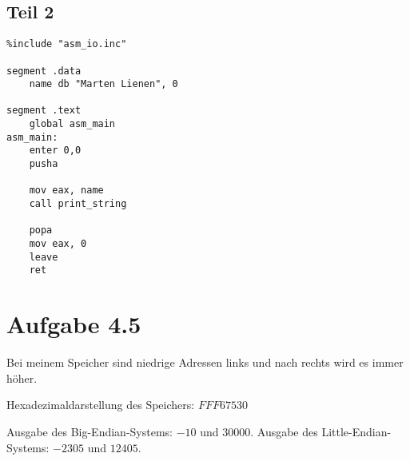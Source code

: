 \documentclass[10pt,a4paper]{article}
\begin{document}
\subsection*{Teil 2}

\begin{lstlisting}
%include "asm_io.inc"

segment .data
	name db "Marten Lienen", 0

segment .text
	global asm_main
asm_main:
	enter 0,0
	pusha

	mov eax, name
	call print_string

	popa
	mov eax, 0
	leave
	ret

\end{lstlisting}

\section*{Aufgabe 4.5}

Bei meinem Speicher sind niedrige Adressen links und nach rechts wird es immer höher.

Hexadezimaldarstellung des Speichers: $FFF67530$

Ausgabe des Big-Endian-Systems: $-10$ und $30000$.
Ausgabe des Little-Endian-Systems: $-2305$ und $12405$.
\end{document}
